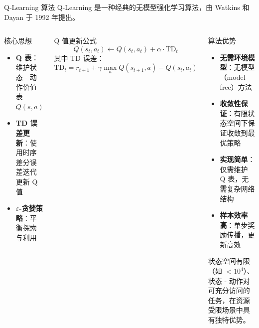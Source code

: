{\begin{frame}{Q-Learning 算法}
    Q-Learning 是一种经典的无模型强化学习算法，由 Watkins 和 Dayan 于 1992 年提出\cite{watkins1992q}。

    \begin{columns}[T]
        \begin{block}{核心思想}
            \scriptsize
            \begin{itemize}
                \item \textbf{Q 表}：维护状态 - 动作价值表 $Q(s,a)$
                \item \textbf{TD 误差更新}：使用时序差分误差迭代更新 Q 值
                \item \textbf{$\varepsilon$-贪婪策略}：平衡探索与利用
            \end{itemize}
        \end{block}

        \begin{block}{Q 值更新公式}
            \scriptsize
            \begin{equation*}
            Q(s_t, a_t) \leftarrow Q(s_t, a_t) + \alpha \cdot \text{TD}_t
            \end{equation*}
            其中 TD 误差：
            \begin{equation*}
            \text{TD}_t = r_{t+1} + \gamma \max_{a} Q(s_{t+1}, a) - Q(s_t, a_t)
            \end{equation*}
        \end{block}

        \begin{block}{算法优势}
            \scriptsize
            \begin{itemize}
                \item \textbf{无需环境模型}：无模型（model-free）方法
                \item \textbf{收敛性保证}：有限状态空间下保证收敛到最优策略
                \item \textbf{实现简单}：仅需维护 Q 表，无需复杂网络结构
                \item \textbf{样本效率高}：单步奖励传播，更新高效
            \end{itemize}
            \scriptsize
                状态空间有限（如 $< 10^4$）、状态 - 动作对可充分访问的任务，在资源受限场景中具有独特优势。

        \end{block}


\end{columns}
\end{frame}}

